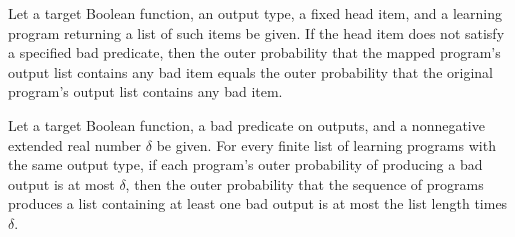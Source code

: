 \begin{theorem}
\label{FABL.LearningProgram.outerEventProbability_map_cons_exists}
\leanok
{}
Let a target Boolean function, an output type, a fixed head item, and a learning program
returning a list of such items be given. If the head item does not satisfy a specified
bad predicate, then the outer probability that the mapped program's output list contains
any bad item equals the outer probability that the original program's output list
contains any bad item.
\end{theorem}

\begin{theorem}
\label{FABL.LearningProgram.outerEventProbability_sequence_exists_le_nsmul}
\leanok
{}
Let a target Boolean function, a bad predicate on outputs, and a nonnegative extended
real number $\delta$ be given. For every finite list of learning programs with the same
output type, if each program's outer probability of producing a bad output is at most
$\delta$, then the outer probability that the sequence of programs produces a list
containing at least one bad output is at most the list length times $\delta$.
\end{theorem}
